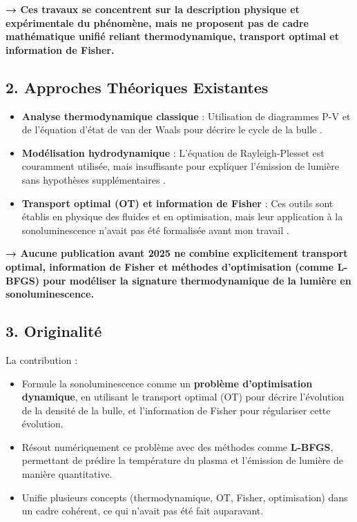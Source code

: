 \documentclass[a4paper,12pt]{article}
\begin{document}
\textbf{→ Ces travaux se concentrent sur la description physique et expérimentale du phénomène, mais ne proposent pas de cadre mathématique unifié reliant thermodynamique, transport optimal et information de Fisher.}

\subsection*{2. Approches Théoriques Existantes}
\begin{itemize}
    \item \textbf{Analyse thermodynamique classique} : Utilisation de diagrammes P-V et de l’équation d’état de van der Waals pour décrire le cycle de la bulle \cite{sciencedirect_thermodynamics}.
    \item \textbf{Modélisation hydrodynamique} : L’équation de Rayleigh-Plesset est couramment utilisée, mais insuffisante pour expliquer l’émission de lumière sans hypothèses supplémentaires \cite{ucla_sonoluminescence}.
    \item \textbf{Transport optimal (OT) et information de Fisher} : Ces outils sont établis en physique des fluides et en optimisation, mais leur application à la sonoluminescence n’avait pas été formalisée avant mon travail \cite{arxiv_fisher_ot}.
\end{itemize}

\textbf{→ Aucune publication avant 2025 ne combine explicitement transport optimal, information de Fisher et méthodes d’optimisation (comme L-BFGS) pour modéliser la signature thermodynamique de la lumière en sonoluminescence.}

\subsection*{3. Originalité}
La contribution :
\begin{itemize}
    \item Formule la sonoluminescence comme un \textbf{problème d’optimisation dynamique}, en utilisant le transport optimal (OT) pour décrire l’évolution de la densité de la bulle, et l’information de Fisher pour régulariser cette évolution.
    \item Résout numériquement ce problème avec des méthodes comme \textbf{L-BFGS}, permettant de prédire la température du plasma et l’émission de lumière de manière quantitative.
    \item Unifie plusieurs concepts (thermodynamique, OT, Fisher, optimisation) dans un cadre cohérent, ce qui n’avait pas été fait auparavant.
\end{itemize}
\end{document}
